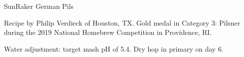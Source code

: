 \begin{recipe}{SunRaker German Pils} %

\begin{aboutblock}
Recipe by Philip Verdieck of Houston, TX. Gold medal in Category 3: Pilsner
during the 2019 National Homebrew Competition in Providence, RI. \sourceaha
\end{aboutblock}


\begin{methodandtiming}
 
\begin{mashsteps}
\end{mashsteps}

\begin{fermentationsteps}
\end{fermentationsteps}

\begin{directions}
Water adjustment: target mash pH of 5.4. Dry hop in primary on day 6. 
\end{directions}

\end{methodandtiming}

\recipebreak

\begin{ingredientsblock}

\begin{malts}
\end{malts}

\begin{hops}
\end{hops}


\end{ingredientsblock}

\end{recipe}
